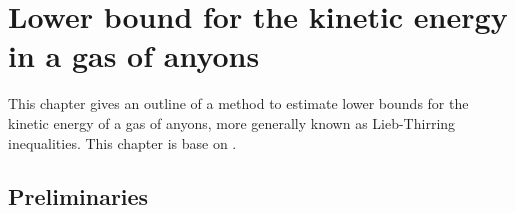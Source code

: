 \documentclass[a4paper,10pt,oneside]{book}
\theoremstyle{plain}
\theoremstyle{definition}
\theoremstyle{remark}
\begin{document}












































\chapter{Lower bound for the kinetic energy in a gas of anyons}\label{chap:kinetic energy}

This chapter gives an outline of a method to estimate lower bounds for the kinetic energy of a gas of anyons, more generally known as Lieb-Thirring inequalities. This chapter is base on \cite{lundholm-solovej}.

\section{Preliminaries}
\end{document}
